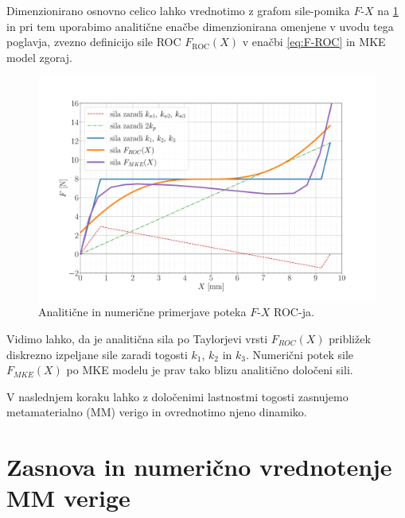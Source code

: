         \newpage
        Dimenzionirano osnovno celico lahko vrednotimo z grafom sile-pomika $F$-$X$ na \ref{fig:sile_ROC} in pri tem uporabimo analitične enačbe dimenzionirana omenjene v uvodu tega poglavja, zvezno definicijo sile ROC $F_{\text{ROC}}(X)$ v enačbi \ref{eq:F-ROC} in MKE model zgoraj. 
        
        \begin{figure}[!hb]
            \centering
            \includegraphics[trim={2.0cm -1.0cm 2.0cm -2.0cm}, clip, width=1\textwidth]{Magisterski praktikum/slike/metodologija/sile_ROC.pdf}
            \caption{Analitične in numerične primerjave poteka $F$-$X$ ROC-ja.}\label{fig:sile_ROC}
        \end{figure}

        Vidimo lahko, da je analitična sila po Taylorjevi vrsti $F_{ROC}(X)$ približek diskrezno izpeljane sile zaradi togosti $k_1$, $k_2$ in $k_3$. 
        Numerični potek sile $F_{MKE}(X)$ po MKE modelu je prav tako blizu analitično določeni sili. 

        V naslednjem koraku lahko z določenimi lastnostmi togosti zasnujemo metamaterialno (MM) verigo in ovrednotimo njeno dinamiko.

    \newpage
    \section{Zasnova in numerično vrednotenje MM verige}\label{sec:zasnova_MM_verige}
        
